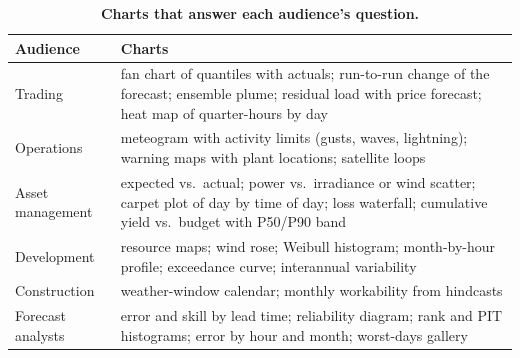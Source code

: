 \begin{table}[t]
\centering\small
\caption{\textbf{Charts that answer each audience's question.}}
\label{tab:viz}
\setlength{\tabcolsep}{3pt}
\begin{tabular}{@{}L{1.85cm}L{5.95cm}@{}}
\toprule
Audience & Charts \\
\midrule
Trading & fan chart of quantiles with actuals; run-to-run change of the forecast; ensemble plume; residual load with price forecast; heat map of quarter-hours by day \\
Operations & meteogram with activity limits (gusts, waves, lightning); warning maps with plant locations; satellite loops \\
Asset management & expected vs.\ actual; power vs.\ irradiance or wind scatter; carpet plot of day by time of day; loss waterfall; cumulative yield vs.\ budget with P50/P90 band \\
Development & resource maps; wind rose; Weibull histogram; month-by-hour profile; exceedance curve; interannual variability \\
Construction & weather-window calendar; monthly workability from hindcasts \\
Forecast analysts & error and skill by lead time; reliability diagram; rank and PIT histograms; error by hour and month; worst-days gallery \\
\bottomrule
\end{tabular}
\end{table}
